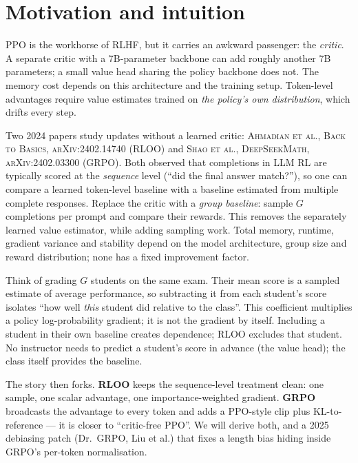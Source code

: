 \documentclass[11pt,oneside]{scrbook}
\begin{document}
\chapter{Motivation and intuition}

PPO is the workhorse of RLHF, but it carries an awkward passenger: the
\emph{critic}. A separate critic with a 7B-parameter backbone can add roughly
another 7B parameters; a small value head sharing the policy backbone does not.
The memory cost depends on this architecture and the training setup.
Token-level advantages require value estimates
trained on \emph{the policy's own distribution}, which drifts every step.


Two 2024 papers study updates without a learned critic:
\textsc{Ahmadian et al., Back to Basics, arXiv:2402.14740} (RLOO) and
\textsc{Shao et al., DeepSeekMath, arXiv:2402.03300} (GRPO). Both observed
that completions in LLM RL are typically scored at the \emph{sequence} level
(``did the final answer match?''), so one can compare a learned token-level baseline with a baseline estimated from multiple complete responses. Replace the critic with a \emph{group
baseline}: sample $G$ completions per prompt and compare their rewards.
This removes the separately learned value estimator, while adding sampling
work. Total memory, runtime, gradient variance and stability depend on the
model architecture, group size and reward distribution; none has a fixed
improvement factor.

\begin{intuition}
Think of grading $G$ students on the same exam. Their mean score is a
sampled estimate of average performance, so subtracting it from each
student's score isolates ``how well \emph{this} student did relative to the
class''. This coefficient multiplies a policy log-probability gradient;
it is not the gradient by itself. Including a student in their own baseline
creates dependence; RLOO excludes that student. No instructor needs to predict
a student's score in advance (the value head); the class itself provides the
baseline.
\end{intuition}

The story then forks. \textbf{RLOO} keeps the sequence-level treatment
clean: one sample, one scalar advantage, one importance-weighted gradient.
\textbf{GRPO} broadcasts the advantage to every token and adds a PPO-style
clip plus KL-to-reference --- it is closer to ``critic-free PPO''. We will
derive both, and a 2025 debiasing patch (Dr.~GRPO, Liu et al.) that fixes a
length bias hiding inside GRPO's per-token normalisation.
\end{document}
